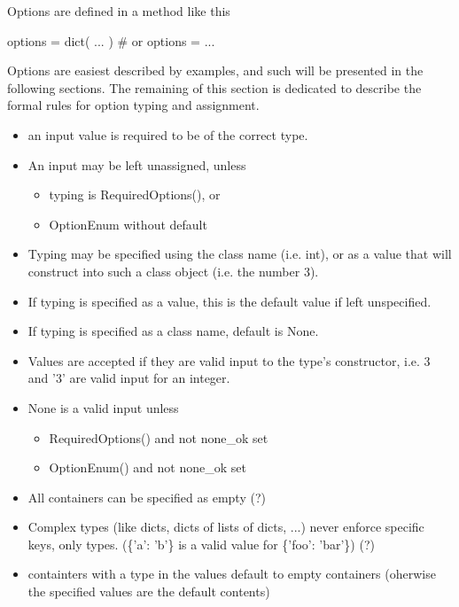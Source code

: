 Options are defined in a method like this
\\
\begin{python}
  options = dict( ... )  # or
  options = { ... }
\end{python}

Options are easiest described by examples, and such will be presented
in the following sections.  The remaining of this section is dedicated
to describe the formal rules for option typing and assignment.

 \begin{itemize}
 \item an input value is required to be of the correct type.

 \item An input may be left unassigned, unless
   \begin{itemize}
   \item typing is RequiredOptions(), or
   \item OptionEnum without default
   \end{itemize}
   
 \item Typing may be specified using the class name (i.e. int), or as
   a value that will construct into such a class object (i.e. the
   number 3).

 \item If typing is specified as a value, this is the default value if
   left unspecified.

 \item If typing is specified as a class name, default is None.

 \item Values are accepted if they are valid input to the type's
   constructor, i.e. 3 and '3' are valid input for an integer.

 \item None is a valid input unless
   \begin{itemize}
   \item RequiredOptions() and not none\_ok set
   \item OptionEnum() and not none\_ok set
   \end{itemize}

 \item All containers can be specified as empty (?)

 \item Complex types (like dicts, dicts of lists of dicts, ...) never
   enforce specific keys, only types. (\{'a': 'b'\} is a valid value
   for \{'foo': 'bar'\}) (?)
   
 \item containters with a type in the values default to empty
   containers (oherwise the specified values are the default contents)

\end{itemize}

